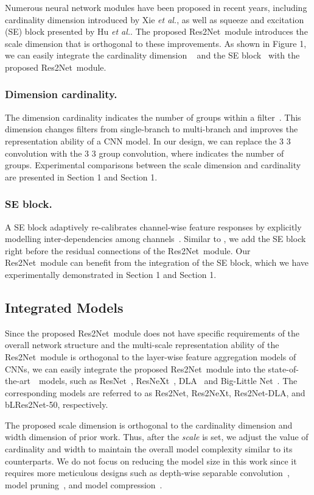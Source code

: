 \documentclass[10pt,journal,cspaper,compsoc]{IEEEtran}
\newcommand{\figref}[1]{Figure 1}\newcommand{\tabref}[1]{Table 1}\newcommand{\secref}[1]{Section 1}
\newcommand{\figref}[1]{Fig.~\ref{#1}}\newcommand{\tabref}[1]{Table~\ref{#1}}\newcommand{\secref}[1]{Sec.~\ref{#1}}
\newcommand{\cmm}[1]{{\textcolor{blue}{#1}}}
\newcommand{\myPara}[1]{\subsubsection{#1}}
\newcommand{\ourM}{{Res2Net}}
\newcommand{\sArt}{{state-of-the-art~}}
\def\etal{{\em et al.}}
\def\etal{{\em et al.}}
\begin{document}
Numerous neural network modules have been proposed in recent years,
including cardinality dimension introduced by Xie \etal \cite{xie2017aggregated},
as well as squeeze and excitation (SE) block presented by
Hu \etal \cite{hu2018senet}.
The proposed \ourM~module introduces the scale dimension
that is orthogonal to  these improvements.
As shown in \figref{fig:improved_structure},
we can easily integrate the cardinality dimension ~\cite{xie2017aggregated}
and the SE block~\cite{hu2018senet} with the proposed \ourM~module.



\myPara{Dimension cardinality.}
The dimension cardinality indicates the number of groups within a
filter~\cite{xie2017aggregated}.
This dimension changes filters from single-branch to multi-branch and
improves the representation ability of a CNN model.
In our design, we can replace the 3  3 convolution
with the 3  3 group convolution,
where  indicates the number of groups.
Experimental comparisons between the scale dimension and cardinality
are presented in \secref{sec:Experiments_ImageNet} and
\secref{sec:compare_dimentions}.


\myPara{SE block.}
A SE block adaptively re-calibrates channel-wise feature responses
by explicitly modelling inter-dependencies among channels~\cite{hu2018senet}.
Similar to \cite{hu2018senet},
we add the SE block right before the residual connections of the \ourM~module.
Our \ourM~module can benefit from the integration of the SE block,
which we have experimentally demonstrated in
\secref{sec:Experiments_ImageNet} and \secref{sec:Experiments_CIFAR}.

\subsection{Integrated Models}

Since the proposed \ourM~module does not have specific requirements of
the overall network structure
and the multi-scale representation ability of the \ourM~module is orthogonal to
the layer-wise feature aggregation models of CNNs,
we can easily integrate the proposed \ourM~module into the \sArt~models,
such as ResNet~\cite{he2016deep},
ResNeXt~\cite{xie2017aggregated}, DLA~\cite{yu2018deep} 
and Big-Little Net~\cite{chen2018biglittle}.
The corresponding models are referred to as
\ourM, Res2NeXt, Res2Net-DLA, and bLRes2Net-50,  respectively.

The proposed scale dimension is orthogonal to the cardinality
\cite{xie2017aggregated}
dimension and width \cmm{\cite{he2016deep}} dimension of prior work.
Thus, after the \emph{scale} is set,
we adjust the value of cardinality and width to maintain the overall
model complexity similar to its counterparts.
We do not focus on reducing the model size in this work
since it requires more meticulous designs such as depth-wise separable
convolution~\cite{Ma_2018_ECCV},
model pruning~\cite{han2015learning}, 
and model compression~\cite{cheng2017survey}.
\end{document}
